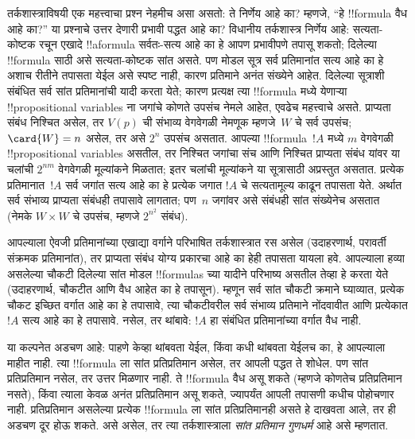 \documentclass[../../../include/open-logic-section]{subfiles}
\begin{document}


तर्कशास्त्राविषयी एक महत्त्वाचा प्रश्न नेहमीच
असा असतो: ते निर्णेय आहे का? म्हणजे,
“हे !!{formula} वैध आहे का?” या प्रश्नाचे
उत्तर देणारी प्रभावी पद्धत आहे का?
विधानीय तर्कशास्त्र निर्णेय आहे:
सत्यता-कोष्टक रचून एखादे
!!a{formula} सर्वतः-सत्य आहे का हे
आपण प्रभावीपणे तपासू शकतो;
दिलेल्या !!{formula} साठी असे
सत्यता-कोष्टक सांत असते.
पण मोडल सूत्र सर्व प्रतिमानांत सत्य
आहे का हे अशाच रीतीने तपासता
येईल असे स्पष्ट नाही, कारण
प्रतिमाने अनंत संख्येने आहेत.
दिलेल्या सूत्राशी संबंधित सर्व
सांत प्रतिमानांची यादी करता येते;
कारण प्रत्यक्ष त्या !!{formula} मध्ये
येणाऱ्या !!{propositional variable}s
ना जगांचे कोणते उपसंच नेमले
आहेत, एवढेच महत्त्वाचे असते.
प्राप्यता संबंध निश्चित असेल,
तर $V(p)$ ची संभाव्य वेगवेगळी
नेमणूक म्हणजे~$W$ चे सर्व
उपसंच; $\card{W} = n$ असेल,
तर असे $2^n$ उपसंच असतात.
आपल्या !!{formula}~$!A$ मध्ये
$m$ वेगवेगळी !!{propositional
  variable}s असतील, तर निश्चित जगांचा संच आणि निश्चित
प्राप्यता संबंध यांवर या चलांची $2^{nm}$ वेगवेगळी
मूल्यांकने मिळतात; इतर चलांची मूल्यांकने या सूत्रासाठी अप्रस्तुत असतात. प्रत्येक
प्रतिमानात~$!A$ सर्व जगांत
सत्य आहे का हे प्रत्येक जगात
$!A$ चे सत्यतामूल्य काढून
तपासता येते. अर्थात सर्व
संभाव्य प्राप्यता संबंधही
तपासावे लागतात; पण~$n$
जगांवर असे संबंधही सांत
संख्येनेच असतात (नेमके
$W \times W$ चे उपसंच,
म्हणजे $2^{n^2}$ संबंध).

आपल्याला  ऐवजी
प्रतिमानांच्या एखाद्या वर्गाने
परिभाषित तर्कशास्त्रात रस
असेल (उदाहरणार्थ,
परावर्ती संक्रमक प्रतिमानांत),
तर प्राप्यता संबंध योग्य प्रकारचा
आहे का हेही तपासता यायला हवे.
आपल्याला हव्या असलेल्या चौकटी
दिलेल्या सांत मोडल !!{formula}s च्या यादीने परिभाष्य
असतील तेव्हा हे करता येते
(उदाहरणार्थ, चौकटीत 
आणि  वैध आहेत का
हे तपासून). म्हणून सर्व सांत
चौकटी क्रमाने घ्याव्यात,
प्रत्येक चौकट इच्छित वर्गात
आहे का हे तपासावे,
त्या चौकटीवरील सर्व संभाव्य
प्रतिमाने नोंदवावीत आणि
प्रत्येकात $!A$ सत्य आहे का
हे तपासावे. नसेल, तर थांबावे:
$!A$ हा संबंधित प्रतिमानांच्या
वर्गात वैध नाही.

या कल्पनेत अडचण आहे:
पाहणे केव्हा थांबवता येईल,
किंवा कधी थांबवता येईलच का,
हे आपल्याला माहीत नाही.
त्या !!{formula} ला सांत
प्रतिप्रतिमान असेल, तर आपली
पद्धत ते शोधेल. पण सांत
प्रतिप्रतिमान नसेल, तर
उत्तर मिळणार नाही.
ते !!{formula} वैध असू शकते
(म्हणजे कोणतेच प्रतिप्रतिमान
नसते), किंवा त्याला केवळ
अनंत प्रतिप्रतिमान असू शकते,
ज्यापर्यंत आपली तपासणी
कधीच पोहोचणार नाही.
प्रतिप्रतिमान असलेल्या प्रत्येक
!!{formula} ला सांत प्रतिप्रतिमानही
असते हे दाखवता आले, तर
ही अडचण दूर होऊ शकते.
असे असेल, तर त्या तर्कशास्त्राला
\emph{सांत प्रतिमान गुणधर्म}
आहे असे म्हणतात.
\end{document}
